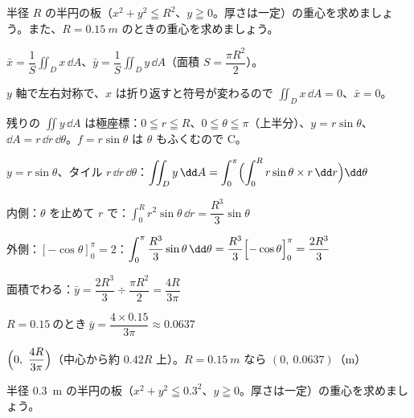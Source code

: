 \begin{reidai}[半円の板の重心]
半径 $R$ の半円の板（$x^2+y^2\leqq R^2$、$y\geqq0$。厚さは一定）の重心を求めましょう。また、$R=\qty{0.15}{m}$ のときの重心を求めましょう。\par
\kangaekata {}\par
{}\enspace $\bar x=\dfrac{1}{S}\iint_D x\,\dd A$、$\bar y=\dfrac{1}{S}\iint_D y\,\dd A$（面積 $S=\dfrac{\pi R^2}{2}$）。\par
{}\enspace $y$ 軸で左右対称で、$x$ は折り返すと符号が変わるので $\iint_D x\,\dd A=0$、$\bar x=0$。\par
{}\enspace 残りの $\iint y\,\dd A$ は極座標：$0\leqq r\leqq R$、$0\leqq\theta\leqq\pi$（上半分）、$y=r\sin\theta$、$\dd A=r\,\dd r\,\dd\theta$。$f=r\sin\theta$ は $\theta$ もふくむので C。\par
\shiki\kviiigs{}\zw{} $y=r\sin\theta$、タイル $r\,\dd r\,\dd\theta$：$\displaystyle \iint_D y\,\dd A=\int_0^{\pi}\Bigl(\int_0^R r\sin\theta\times r\,\dd r\Bigr)\dd\theta$\par
\kviiiga 内側：$\theta$ を止めて $r$ で：$\displaystyle \int_0^R r^2\sin\theta\,\dd r=\dfrac{R^3}{3}\sin\theta$\par
\kviiiga 外側：$[-\cos\theta]_0^{\pi}=2$：$\displaystyle \int_0^{\pi}\dfrac{R^3}{3}\sin\theta\,\dd\theta=\dfrac{R^3}{3}\Bigl[-\cos\theta\Bigr]_0^{\pi}=\dfrac{2R^3}{3}$\par
\kviiiga 面積でわる：$\displaystyle \bar y=\dfrac{2R^3}{3}\div\dfrac{\pi R^2}{2}=\dfrac{4R}{3\pi}$\par
\kviiiga $\displaystyle R=0.15\ \text{のとき}\ \bar y=\dfrac{4\times0.15}{3\pi}\approx0.0637$\par
\kotae $\Bigl(0,\ \dfrac{4R}{3\pi}\Bigr)$（中心から約 $0.42R$ 上）。$R=\qty{0.15}{m}$ なら $(0,\ 0.0637)$（m）
\end{reidai}

\begin{jibun}
半径 \qty{0.3}{m} の半円の板（$x^2+y^2\leqq0.3^2$、$y\geqq0$。厚さは一定）の重心を求めましょう。
\end{jibun}

